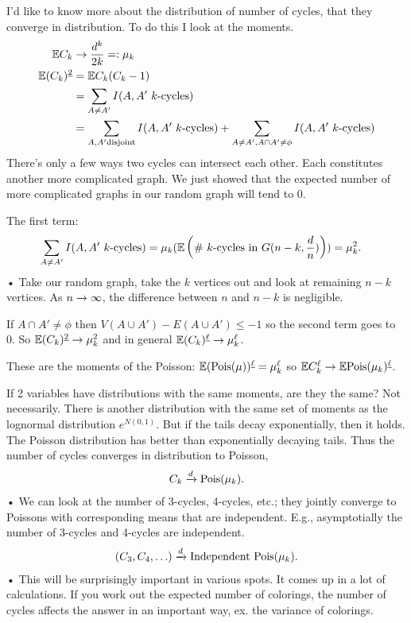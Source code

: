 I'd like to know more about the distribution of number of cycles, that they converge in distribution. 
To do this I look at the moments.
\begin{align}
\mathbb{E} C_k &\to \frac{d^k}{2k} =: \mu_k\\
\mathbb{E} (C_k)^{\underline{2}} &= \mathbb{E} C_k(C_k-1)\\
&= \sum_{A\ne A'} I(A,A'\text{ $k$-cycles})\\
&= \sum_{A,A' \text{disjoint} } I(A,A'\text{ $k$-cycles}) + \sum_{A\ne A', A\cap A'\ne \phi} I(A,A'\text{ $k$-cycles})
\end{align}
There's only a few ways two cycles  can intersect each other. Each constitutes another more complicated graph. We just showed that the expected number of more complicated graphs in our random graph will tend to 0.

The first term:
\begin{align}
\sum_{A\ne A'} I(A,A'\text{ $k$-cycles})
&=\mu_k (\mathbb{E}\left( \text{\# $k$-cycles in $G(n-k,\frac{d}{n})$} \right)) = \mu_k^2.
\end{align}•
Take our random graph, take the $k$ vertices out and look at remaining $n-k$ vertices. As $n\to \infty$, the difference between $n$ and $n-k$ is negligible. 

If $A\cap A'\ne \phi$ then $V(A\cup A')-E(A\cup A')\le -1$ so the second term goes to 0. So $\mathbb{E}(C_k)^{\underline{2}}\to \mu_k^2$ and in general $\mathbb{E}(C_k)^{\underline{\ell}}\to \mu_k^\ell$.

These are the moments of the Poisson: $\mathbb{E} (\text{Pois}(\mu))^{\underline{\ell}}=\mu_k^\ell$ so $\mathbb{E} C_k^\ell \to \mathbb{E} \text{Pois}(\mu_k)^{\underline{\ell}}$.

If 2 variables have distributions with the same moments, are they the same? Not necessarily.
There is another distribution with the same set of moments as the lognormal distribution $e^{N(0,1)}$. But if the tails decay exponentially, then it holds. The Poisson distribution has better than exponentially decaying tails. Thus the number of cycles converges in distribution to Poisson,
\begin{align}
C_k\xrightarrow{d} \text{Pois}(\mu_k).
\end{align}•
We can look at the number of 3-cycles, 4-cycles, etc.; they jointly converge to Poissons with corresponding means that are independent. E.g., asymptotially the number of 3-cycles and 4-cycles are independent. 
\begin{align}
(C_3,C_4,\ldots)\xrightarrow{d}\text{Independent }\text{Pois}(\mu_k).
\end{align}•
This will be surprisingly important in various spots. It comes up in a lot of calculations. If you work out the expected number of colorings, the number of cycles affects the answer in an important way, ex. the variance of colorings.

